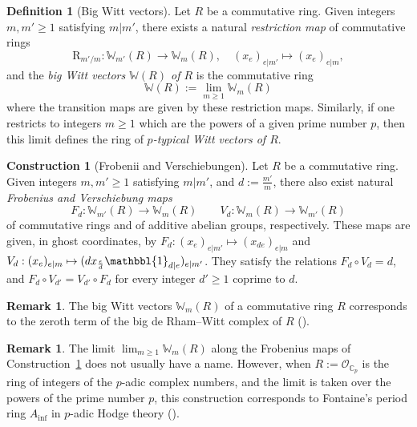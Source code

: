 \documentclass[10pt,twoside]{scrarticle}
\newlength{\mar} \setlength{\mar}{1cm}%
\newlength{\len}
\theoremstyle{definition}
\newtheorem{remark}[theorem]{Remark}
\newtheorem{construction}[theorem]{Construction}
\newtheorem{definition}[theorem]{Definition}
\DeclareMathOperator{\C}{\mathbb{C}}
\newcommand{\W}{\mathbb{W}}
\renewcommand{\ge}{\geqslant}
\numberwithin{equation}{theorem}
\begin{document}
\begin{definition}[Big Witt vectors]\label{definitionbigWittvectors}
    Let $R$ be a commutative ring. Given integers $m,m' \ge 1$ satisfying $m | m'$, there exists a natural \emph{restriction map} of commutative rings
    $$\text{R}_{m'/m} : \W_{m'}(R) \longrightarrow \W_m(R), \quad (x_e)_{e|m'} \longmapsto (x_e)_{e|m},$$
    and the \emph{big Witt vectors $\W(R)$ of $R$} is the commutative ring
    $$\W(R) := \lim_{m \ge 1} \W_m(R)$$
    where the transition maps are given by these restriction maps. Similarly, if one restricts to integers $m \ge 1$ which are the powers of a given prime number $p$, then this limit defines the ring of \emph{$p$-typical Witt vectors of $R$}.
\end{definition}

\begin{construction}[Frobenii and Verschiebungen]\label{constructionfrobeniiandverschiebungen}
    Let $R$ be a commutative ring. Given integers $m,m' \ge 1$ satisfying $m | m'$, and $d := \frac{m'}{m}$, there also exist natural \emph{Frobenius and Verschiebung maps}
    $$F_{d} : \W_{m'}(R) \longrightarrow \W_m(R) \quad \quad V_{d} : \W_m(R) \longrightarrow \W_{m'}(R)$$
    of commutative rings and of additive abelian groups, respectively. These maps are given, in ghost coordinates, by $F_{d} : (x_e)_{e|m'} \mapsto (x_{de})_{e|m}$ and $V_{d} : (x_e)_{e|m} \mapsto (dx_{\frac{e}{d}}\mathbbl{1}_{d|e})_{e|m'}$. They satisfy the relations $F_d \circ V_d = d$, 
    and $F_d \circ V_{d'} = V_{d'} \circ F_d$ for every integer $d' \ge 1$ coprime to $d$. 
\end{construction}

\begin{remark}
    The big Witt vectors $\W_m(R)$ of a commutative ring $R$ corresponds to the zeroth term of the big de Rham--Witt complex of $R$ (\cite{hesselholt_deRham-Witt}).
\end{remark}

\begin{remark}\label{remarkAinf}
    The limit $\lim_{m \ge 1} \W_m(R)$ along the Frobenius maps of Construction~\ref{constructionfrobeniiandverschiebungen} does not usually have a name. However, when $R:=\mathcal{O}_{\C_p}$ is the ring of integers of the $p$-adic complex numbers, and the limit is taken over the powers of the prime number $p$, this construction corresponds to Fontaine's period ring $A_{\text{inf}}$ in $p$-adic Hodge theory (\cite[Lemma~3.2]{bhatt_integral_2018}).
\end{remark}
\end{document}
